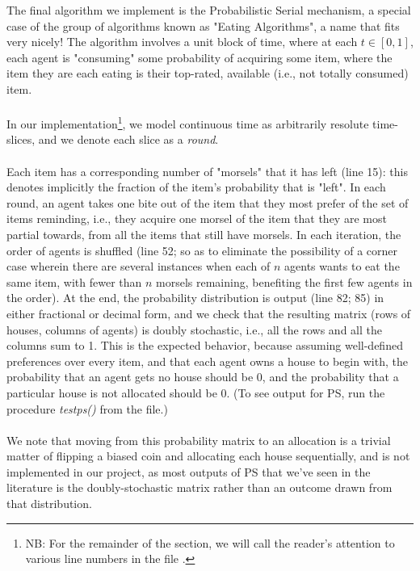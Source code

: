 \documentclass[12pt]{article}
\begin{document}
The final algorithm we implement is the Probabilistic Serial mechanism, a special case of the group of algorithms known as "Eating Algorithms", a name that fits very nicely! The algorithm involves a unit block of time, where at each $t \in [0, 1]$, each agent is "consuming" some probability of acquiring some item, where the item they are each eating is their top-rated, available (i.e., not totally consumed) item.\\\\In our implementation\footnote{NB: For the remainder of the section, we will call the reader's attention to various line numbers in the file .}, we model continuous time as arbitrarily resolute time-slices, and we denote each slice as a \emph{round}.
\\\\Each item has a corresponding number of "morsels" that it has left (line 15): this denotes implicitly the fraction of the item's probability that is "left". In each round, an agent takes one bite out of the item that they most prefer of the set of items reminding, i.e., they acquire one morsel of the item that they are most partial towards, from all the items that still have morsels. In each iteration, the order of agents is shuffled (line 52; so as to eliminate the possibility of a corner case wherein there are several instances when each of $n$ agents wants to eat the same item, with fewer than $n$ morsels remaining, benefiting the first few agents in the order). At the end, the probability distribution is output (line 82; 85) in either fractional or decimal form, and we check that the resulting matrix (rows of houses, columns of agents) is doubly stochastic, i.e., all the rows and all the columns sum to 1. This is the expected behavior, because assuming well-defined preferences over every item, and that each agent owns a house to begin with, the probability that an agent gets no house should be 0, and the probability that a particular house is not allocated should be 0. (To see output for PS, run the procedure \emph{test\textunderscore ps()} from the file.)\\\\We note that moving from this probability matrix to an allocation is a trivial matter of flipping a biased coin and allocating each house sequentially, and is not implemented in our project, as most outputs of PS that we've seen in the literature is the doubly-stochastic matrix rather than an outcome drawn from that distribution.
\end{document}
